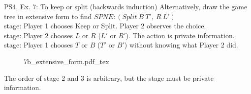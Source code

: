 \begin{frame}{PS4, Ex. 7: To keep or split (backwards induction)}
  Alternatively, draw the game tree in extensive form to find $SPNE:(Split\ B\ T',\ R\ L')$\\\medskip
   stage: Player 1 chooses Keep or Split. Player 2 observes the choice.\\\medskip
   stage: Player 2 chooses $L$ or $R$ ($L'$ or $R'$). The action is private information.\\\medskip
   stage: Player 1 chooses $T$ or $B$ ($T'$ or $B'$) without knowing what Player 2 did.\\\medskip
  \begin{figure}[!h]
    \center
    \def\svgwidth{\columnwidth}
    {7b_extensive_form.pdf_tex}

  \end{figure}
  \vspace{-8pt}
  The order of stage 2 and 3 is arbitrary, but the  stage must be private information.
\end{frame}


